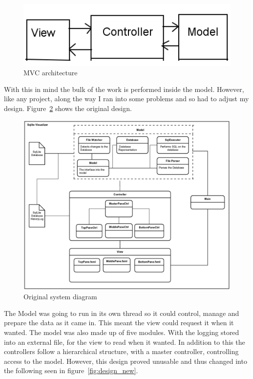 \begin{figure}[H]
	\centering
	\includegraphics[scale=0.5]{images/mvc.png}
	\caption{MVC architecture}
	\label{fig:mvc}
\end{figure}

With this in mind the bulk of the work is performed inside the model. However, like any project, along the way I ran into some problems and so had to adjust my design. Figure~\ref{fig:design_old} shows the original design.

\begin{figure}[H]
	\centering
	\includegraphics[scale=0.2]{images/system_diagram_old.png}
	\caption{Original system diagram}
	\label{fig:design_old}
\end{figure}

The Model was going to run in its own thread so it could control, manage and prepare the data as it came in. This meant the view could request it when it wanted. The model was also made up of five modules. With the logging  stored into an external file, for the view to read when it wanted. In addition to this the controllers follow a hierarchical structure, with a master controller, controlling access to the model. However, this design proved unusable and thus changed into the following seen in figure~\ref{fig:design_new}. 


